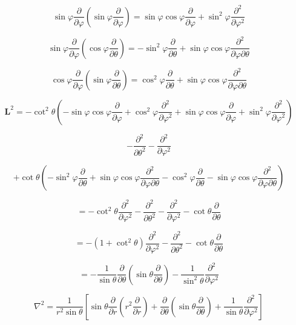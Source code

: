 \documentclass[12pt]{article}
\begin{document}
\[
    \sin{\varphi} \frac{\partial}{\partial \varphi}
    \left(\sin{\varphi} \frac{\partial}{\partial \varphi}\right)
    = \sin{\varphi} \cos{\varphi} \frac{\partial}{\partial \varphi}
    + \sin^2{\varphi} \frac{\partial^2}{\partial \varphi^2}
\]

\[
    \sin{\varphi} \frac{\partial}{\partial \varphi}
    \left(\cos{\varphi} \frac{\partial}{\partial \theta}\right)
    = - \sin^2{\varphi} \frac{\partial}{\partial \theta}
    + \sin{\varphi} \cos{\varphi} \frac{\partial^2}{\partial \varphi \partial \theta}
\]

\[
    \cos{\varphi} \frac{\partial}{\partial \varphi}
    \left(\sin{\varphi} \frac{\partial}{\partial \theta}\right)
    = \cos^2{\varphi} \frac{\partial}{\partial \theta}
    + \sin{\varphi} \cos{\varphi} \frac{\partial^2}{\partial \varphi \partial \theta}
\]

\[
    \textbf{L}^2 = - \cot^2{\theta}
    \left(
    -\sin{\varphi} \cos{\varphi} \frac{\partial}{\partial \varphi}
    + \cos^2{\varphi} \frac{\partial^2}{\partial \varphi^2}
    + \sin{\varphi} \cos{\varphi} \frac{\partial}{\partial \varphi}
    + \sin^2{\varphi} \frac{\partial^2}{\partial \varphi^2}
    \right)
\]

\[
    - \frac{\partial^2}{\partial \theta^2}
    - \frac{\partial^2}{\partial \varphi^2}
\]

\[
    + \cot{\theta}
    \left(
    - \sin^2{\varphi} \frac{\partial}{\partial \theta}
    + \sin{\varphi} \cos{\varphi} \frac{\partial^2}{\partial \varphi \partial \theta}
    - \cos^2{\varphi} \frac{\partial}{\partial \theta}
    - \sin{\varphi} \cos{\varphi} \frac{\partial^2}{\partial \varphi \partial \theta}
    \right)
\]

\[
    = - \cot^2{\theta} \frac{\partial^2}{\partial \varphi^2}
    - \frac{\partial^2}{\partial \theta^2}
    - \frac{\partial^2}{\partial \varphi^2}
    - \cot{\theta} \frac{\partial}{\partial \theta}
\]

\[
    = - \left(1 + \cot^2{\theta}\right)  \frac{\partial^2}{\partial \varphi^2}
    - \frac{\partial^2}{\partial \theta^2}
    - \cot{\theta} \frac{\partial}{\partial \theta}
\]

\[
    = - \frac{1}{\sin{\theta}} \frac{\partial}{\partial \theta}
    \left(\sin{\theta} \frac{\partial}{\partial \theta}\right)
    - \frac{1}{\sin^2{\theta}} \frac{\partial^2}{\partial \varphi^2}
\]

\[
    \nabla^2 = \frac{1}{r^2 \sin{\theta}}
    \left[
        \sin{\theta} \frac{\partial}{\partial r} \left(r^2 \frac{\partial}{\partial r}\right)
        + \frac{\partial}{\partial \theta} \left(\sin{\theta} \frac{\partial}{\partial \theta}\right)
        + \frac{1}{\sin{\theta}} \frac{\partial^2}{\partial \varphi^2}
        \right]
\]
\end{document}
